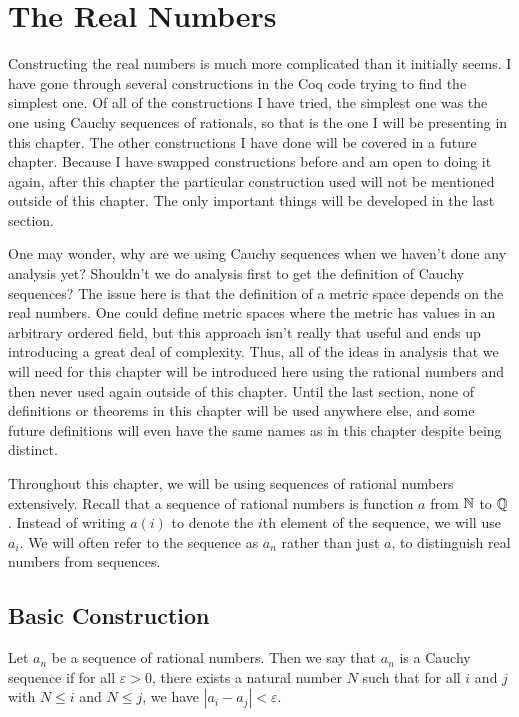 \documentclass[../../math.tex]{subfiles}
\begin{document}
\setcounter{chapter}{10}

\chapter{The Real Numbers}

Constructing the real numbers is much more complicated than it initially seems.
I have gone through several constructions in the Coq code trying to find the
simplest one.  Of all of the constructions I have tried, the simplest one was
the one using Cauchy sequences of rationals, so that is the one I will be
presenting in this chapter.  The other constructions I have done will be covered
in a future chapter.  Because I have swapped constructions before and am open to
doing it again, after this chapter the particular construction used will not be
mentioned outside of this chapter.  The only important things will be developed
in the last section.

One may wonder, why are we using Cauchy sequences when we haven't done any
analysis yet?  Shouldn't we do analysis first to get the definition of Cauchy
sequences?  The issue here is that the definition of a metric space depends on
the real numbers.  One could define metric spaces where the metric has values in
an arbitrary ordered field, but this approach isn't really that useful and ends
up introducing a great deal of complexity.  Thus, all of the ideas in analysis
that we will need for this chapter will be introduced here using the rational
numbers and then never used again outside of this chapter.  Until the last
section, none of definitions or theorems in this chapter will be used anywhere
else, and some future definitions will even have the same names as in this
chapter despite being distinct.

Throughout this chapter, we will be using sequences of rational numbers
extensively.  Recall that a sequence of rational numbers is function $a$ from
$\mathbb{N}$ to $\mathbb{Q}$.  Instead of writing $a(i)$ to denote the $i$th element of the
sequence, we will use $a_i$.  We will often refer to the sequence as $a_n$
rather than just $a$, to distinguish real numbers from sequences.

\section{Basic Construction}

\begin{definition}
    Let $a_n$ be a sequence of rational numbers.  Then we say that $a_n$ is a
    Cauchy sequence if for all $\varepsilon > 0$, there exists a natural number
    $N$ such that for all $i$ and $j$ with $N \leq i$ and $N \leq j$, we have
    $|a_i - a_j| < \varepsilon$.
\end{definition}
\end{document}

